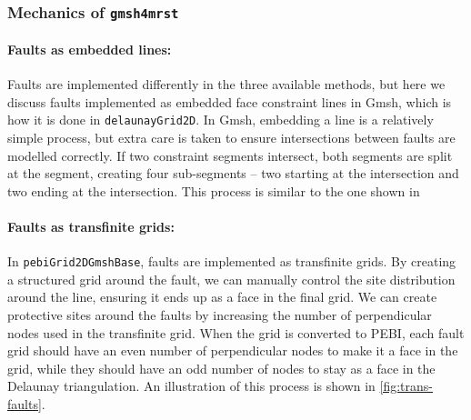 \subsubsection{Mechanics of \texttt{gmsh4mrst}}
\paragraph{Faults as embedded lines:}
Faults are implemented differently in the three available methods, but here we discuss faults implemented as embedded face constraint lines in Gmsh, which is how it is done in \verb|delaunayGrid2D|. In Gmsh, embedding a line is a relatively simple process, but extra care is taken to ensure intersections between faults are modelled correctly. If two constraint segments intersect, both segments are split at the segment, creating four sub-segments -- two starting at the intersection and two ending at the intersection. This process is similar to the one shown in 

\paragraph{Faults as transfinite grids:}
In \verb|pebiGrid2DGmshBase|, faults are implemented as transfinite grids. By creating a structured grid around the fault, we can manually control the site distribution around the line, ensuring it ends up as a face in the final grid. We can create protective sites around the faults by increasing the number of perpendicular nodes used in the transfinite grid. When the grid is converted to PEBI, each fault grid should have an even number of perpendicular nodes to make it a face in the grid, while they should have an odd number of nodes to stay as a face in the Delaunay triangulation. An illustration of this process is shown in \autoref{fig:trans-faults}.

